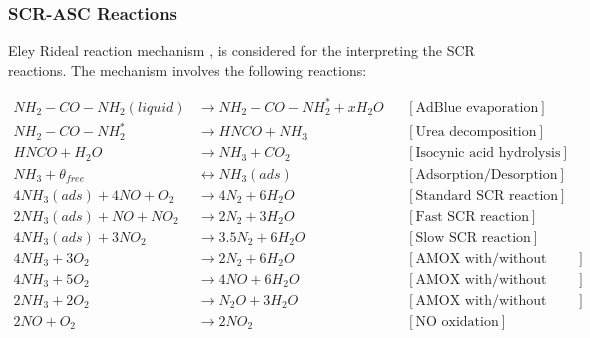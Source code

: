 \subsubsection{SCR-ASC Reactions}
Eley Rideal reaction mechanism \cite{hsieh2011development}
\cite{yuan2015diesel}, \cite{nova2014urea} is considered for the interpreting
the SCR reactions. The mechanism involves the following reactions:

\begin{align}
    NH_2 - CO - NH_2 (liquid) &\longrightarrow NH_2 - CO - NH_2^* + x H_2 O
                & &[\text{AdBlue evaporation}] \label{eqn::urea_1} \\
    NH_2 - CO - NH_2^*  &\longrightarrow  HNCO + NH_3
                & &[\text{Urea decomposition}] \label{eqn::urea_2}\\
    HNCO + H_2O &\longrightarrow NH_3 + CO_2
                & &[\text{Isocynic acid hydrolysis}] \label{eqn::urea_3}\\
    NH_3 + \theta_{free} &\longleftrightarrow NH_3(ads)
                & &[\text{Adsorption/Desorption}] \label{eqn::ads}\\
    4 NH_3 (ads) + 4 NO + O_2 &\longrightarrow 4 N_2 + 6 H_2O
                              & &[\text{Standard SCR reaction}]
                              \label{eqn::std_scr}\\
    2 NH_3 (ads) +  NO + N O_2 &\longrightarrow 2 N_2 + 3 H_2O
                              & &[\text{Fast SCR reaction}]
                              \label{eqn::fast_scr}\\
    4 NH_3 (ads) + 3N O_2 &\longrightarrow 3.5 N_2 + 6 H_2O
                              & &[\text{Slow SCR reaction}]
                              \label{eqn::slow_scr}\\
    4 NH_3 + 3 O_2 &\longrightarrow 2 N_2 + 6 H_2O
                         & &[\text{AMOX with/without ASC}]
                         \label{eqn::amox_N2}\\
    4 NH_3 + 5 O_2 &\longrightarrow 4 NO + 6 H_2 O
                         & &[\text{AMOX with/without ASC}]
                         \label{eqn::amox_NO}\\
    2 NH_3 + 2 O_2 &\longrightarrow N_2O + 3 H_2O
                         & &[\text{AMOX with/without ASC}]
                         \label{eqn::amox_N20}\\
    2 NO + O_2 &\longrightarrow 2 NO_2
                        & &[\text{NO oxidation}]
                        \label{eqn::NOX}
\end{align}


